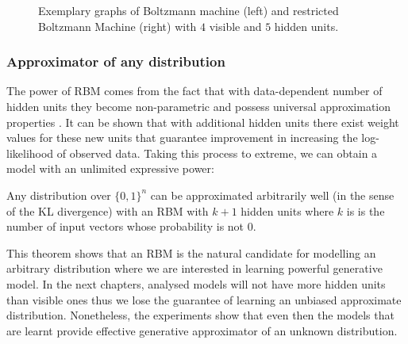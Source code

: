 \begin{figure}[!h]
\begin{center}
\end{center}
\endminipage\hfill
  \caption[Boltzmann Machines]{Exemplary graphs of Boltzmann machine (left) and restricted Boltzmann Machine (right) with $4$ visible and $5$ hidden units.}
  \label{fig:bm}
\end{figure}

\subsubsection{Approximator of any distribution}
The power of RBM comes from the fact that with data-dependent number of hidden units they become non-parametric and possess universal approximation properties \cite{le2008representational}.
It can be shown that with additional hidden units there exist weight values for these new units that guarantee improvement in increasing the log-likelihood of observed data. Taking this process to extreme, we can obtain a model with an unlimited expressive power:
\begin{theorem}  Any distribution over $\{0,1 \}^n$ can be approximated arbitrarily well (in the sense of the KL divergence) with an RBM with $k+1$ hidden units where	$k$ is is the number of input vectors whose probability is not $0$.
\end{theorem}
This theorem shows that an RBM is the natural candidate for modelling an arbitrary distribution where we are interested in learning powerful generative model. In the next chapters, analysed models will not have more hidden units than visible ones thus we lose the guarantee of learning an unbiased approximate distribution. Nonetheless, the experiments show that even then the models that are learnt provide effective generative approximator of an unknown distribution.

